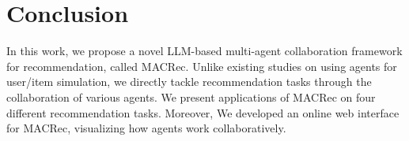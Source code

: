 \section{Conclusion}
In this work, we propose a novel LLM-based multi-agent collaboration framework for recommendation, called MACRec.
Unlike existing studies on using agents for user/item simulation, we directly tackle recommendation tasks through the collaboration of various agents. 
We present applications of MACRec on four different recommendation tasks. %
Moreover, We developed an online web interface for MACRec, visualizing how agents work collaboratively. 


